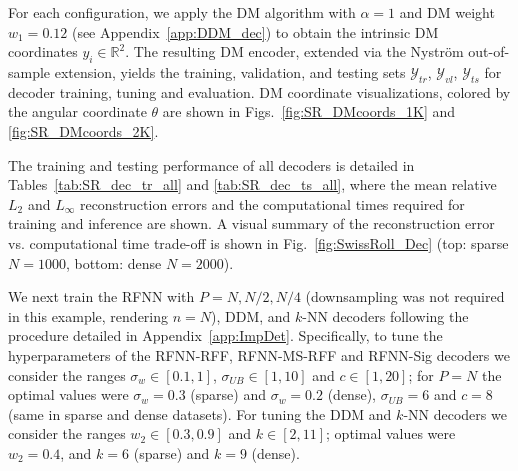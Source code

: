\documentclass{article}
\begin{document}
For each configuration, we apply the DM algorithm with $\alpha=1$ and DM weight $w_1=0.12$ (see Appendix~\ref{app:DDM_dec}) to obtain the intrinsic DM coordinates $y_i\in\mathbb{R}^2$. The resulting DM encoder, extended via the Nystr\"{o}m out-of-sample extension, yields the training, validation, and testing sets $\mathcal{Y}_{tr}$, $\mathcal{Y}_{vl}$, $\mathcal{Y}_{ts}$ for decoder training, tuning and evaluation. DM coordinate visualizations, colored by the angular coordinate $\theta$ are shown in Figs.~\ref{fig:SR_DMcoords_1K} and \ref{fig:SR_DMcoords_2K}.

The training and testing performance of all decoders is detailed in Tables~\ref{tab:SR_dec_tr_all} and \ref{tab:SR_dec_ts_all}, where the mean relative $L_2$ and $L_\infty$ reconstruction errors and the computational times required for training and inference are shown. A visual summary of the reconstruction error vs. computational time trade-off is shown in Fig.~\ref{fig:SwissRoll_Dec} (top: sparse $N=1000$, bottom: dense $N=2000$). 

We next train the RFNN with $P=N,N/2,N/4$ (downsampling was not required in this example, rendering $n=N$), DDM, and $k$-NN decoders following the procedure detailed in Appendix~\ref{app:ImpDet}. Specifically, to tune the hyperparameters of the RFNN-RFF, RFNN-MS-RFF and RFNN-Sig decoders we consider the ranges $\sigma_w\in[0.1,1]$, $\sigma_{UB}\in[1,10]$ and $c \in [1,20]$; for $P=N$ the optimal values were $\sigma_w=0.3$ (sparse) and $\sigma_w=0.2$ (dense), $\sigma_{UB}=6$ and $c=8$ (same in sparse and dense datasets). For tuning the DDM and $k$-NN decoders we consider the ranges $w_2\in[0.3,0.9]$ and $k\in[2,11]$; optimal values were $w_2=0.4$, and $k=6$ (sparse) and $k=9$ (dense). 
\end{document}
